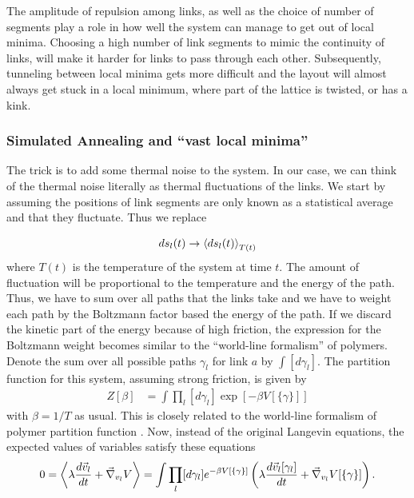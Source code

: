 \documentclass[nofootinbib,preprint,floatfix,titlepage,superscriptaddress]{revtex4} %
\begin{document}
The amplitude of repulsion among links, as well as the choice of number of segments  play a role in how well the system can manage to get out of local minima. 
Choosing a high number of link segments to mimic the continuity of links, will make it harder for links to pass through each other. 
Subsequently, tunneling between local minima gets more difficult and the layout will almost always get stuck in a local minimum, where part of the lattice is twisted, or has a kink.


\subsubsection{Simulated Annealing and ``vast local minima'' \label{ap:annealing}}
The trick is to add some thermal noise to the system. In our case, we can think of the thermal noise literally as thermal fluctuations of the links. We start by assuming the positions of link segments are only known as a statistical average and that they fluctuate. Thus we replace

\[ds_l(t) \to \left<ds_l(t)\right>_{T(t)} \]
where $T(t)$ is the temperature of the system at time $t$. 
The amount of fluctuation will be proportional to the temperature and the energy of the path. Thus, we have to sum over all paths that the links take and we have to weight each path by the Boltzmann factor based the energy of the path. If we discard the kinetic part of the energy because of high friction, the expression for the Boltzmann weight becomes similar to the ``world-line formalism'' of polymers. Denote the sum over all possible paths $\gamma_l$ for link $a$ by $\int [d\gamma_l]$. The partition function for this system, assuming strong friction, is given by
\begin{align}
    Z[\beta] & = \int \prod_l [d\gamma_l] \exp\left[-\beta V[\{\gamma\}]\right]  
\end{align}
with $\beta = 1/T$ as usual. 
This is closely related to the world-line formalism of polymer partition function \citep{des1974lagrangian}. 
Now, instead of the original Langevin equations, the expected values of variables satisfy these equations
\begin{equation}
0= \left<\lambda {d \vec{v}_l \over dt } + \vec{\nabla}_{{v}_l} V\right> = \int \prod_l [d\gamma_l] e^{-\beta V[\{\gamma\}]}\left(\lambda {d \vec{v}_l[\gamma_l] \over dt } + \vec{\nabla}_{{v}_l} V[\{\gamma\}]\right)  \label{eq:Langevin2}.
\end{equation}
\end{document}
